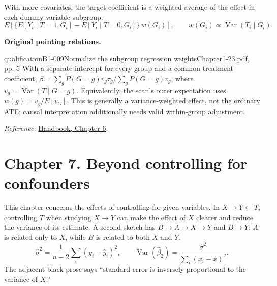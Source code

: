 {With more covariates, the target coefficient is a weighted average of the effect in each dummy-variable subgroup:
\[E\!\left[\{E[Y_i\mid T=1,G_i]-E[Y_i\mid T=0,G_i]\}\,w(G_i)\right],\qquad
w(G_i)\propto\operatorname{Var}(T_i\mid G_i).
\]

\par{}\smallskip\textbf{Original pointing relations.}\par\smallskip
{}
\begin{reviewnote}{qualification}{B1-009}{Normalize the subgroup regression weights}{Chapter1-23.pdf, pp. 5}
With a separate intercept for every group and a common treatment coefficient, $\beta=\sum_g P(G=g)v_g\tau_g/\sum_gP(G=g)v_g$, where $v_g=\operatorname{Var}(T\mid G=g)$. Equivalently, the scan's outer expectation uses $w(g)=v_g/E[v_G]$. This is generally a variance-weighted effect, not the ordinary ATE; causal interpretation additionally needs valid within-group adjustment.
\par\smallskip\textit{Reference:} \href{https://matheusfacure.github.io/python-causality-handbook/06-Grouped-and-Dummy-Regression.html}{Handbook, Chapter 6}.
\end{reviewnote}
\section{Chapter 7. Beyond controlling for confounders}
This chapter concerns the effects of controlling for given variables. In $X\to Y\leftarrow T$, controlling $T$ when studying $X\to Y$ can make the effect of $X$ clearer and reduce the variance of its estimate. A second sketch has $B\to A\to X\to Y$ and $B\to Y$: $A$ is related only to $X$, while $B$ is related to both $X$ and $Y$. 
\[\hat\sigma^2=\frac{1}{n-2}\sum_i(y_i-\hat y_i)^2,\qquad
\operatorname{Var}(\hat\beta_2)=\frac{\hat\sigma^2}{\sum_i(x_i-\bar x)^2}.\]
The adjacent black prose says ``standard error is inversely proportional to the variance of $X$.'' 

}
